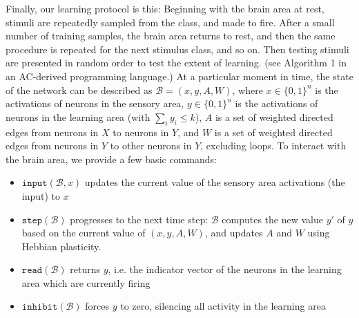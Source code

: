 \documentclass[final,12pt]{colt2022} %
\begin{document}
Finally, our learning protocol is this: Beginning with the brain area at rest, stimuli are repeatedly sampled from the class, and made to fire. %
After a small number of training samples, the brain area returns to rest, and then the same procedure is repeated for the next stimulus class, and so on.  Then testing stimuli are presented in random order to test the extent of learning.
(see Algorithm 1 in an AC-derived programming language.)
At a particular moment in time, the state of the network can be described as $\mathcal B = (x, y, A, W)$, where $x \in \{0, 1\}^n$ is the activations of neurons in the sensory area, $y \in \{0, 1\}^n$ is the activations of neurons in the learning area (with $\sum_{i} y_i \le k$), $A$ is a set of weighted directed edges from  neurons in $X$ to neurons in $Y$, and $W$ is a set of weighted directed edges from neurons in $Y$ to other neurons in $Y$, excluding loops. To interact with the brain area, we provide a few basic commands: 

\begin{itemize}
    \item $\texttt{input}(\mathcal B, x)$ updates the current value of the sensory area activations (the input) to $x$
    \item $\texttt{step}(\mathcal B)$ progresses to the next time step: $\mathcal B$ computes the new value $y'$ of $y$ based on the current value of $(x, y, A, W)$, and updates $A$ and $W$ using Hebbian plasticity.
    \item $\texttt{read}(\mathcal B)$ returns $y$, i.e. the indicator vector of the neurons in the learning area which are currently firing
    \item $\texttt{inhibit}(\mathcal B)$ forces $y$ to zero, silencing all activity in the learning area
\end{itemize}
\fi

\begin{algorithm} \label{alg:mechanism}
\caption{The learning mechanism. ($B$ denotes the brain area.)}
\end{algorithm}
\end{document}

